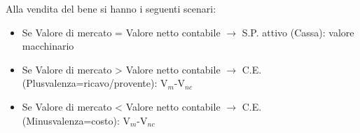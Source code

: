 Alla vendita del bene si hanno i seguenti scenari:
\begin{itemize}
	\item Se Valore di mercato = Valore netto contabile $\rightarrow$ S.P. attivo (Cassa): valore macchinario
	\item Se Valore di mercato > Valore netto contabile $\rightarrow$ C.E. (Plusvalenza=ricavo/provente): V$_m$-V$_{nc}$
	\item Se Valore di mercato < Valore netto contabile $\rightarrow$ C.E. (Minusvalenza=costo): V$_m$-V$_{nc}$
\end{itemize}